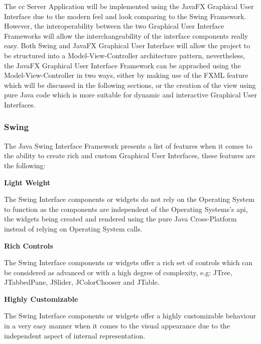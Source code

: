 The \acrfull{cc} Server Application will be implemented using the JavaFX
Graphical User Interface due to the modern feel and look comparing to the
Swing Framework. However, the interoperability between the two Graphical
User Interface Frameworks will allow the interchangeability of the interface
components really easy. Both Swing and JavaFX Graphical User Interface will
allow the project to be structured into a Model-View-Controller architecture
pattern, nevertheless, the JavaFX Graphical User Interface Framework can be
apprached using the Model-View-Controller in two ways, either by making use
of the FXML feature which will be discussed in the following sections, or
the creation of the view using pure Java code which is more suitable for dynamic
and interactive Graphical User Interfaces.

\newpage

\subsubsection{Swing}

The Java Swing Interface Framework presents a list of features when it comes
to the ability to create rich and custom Graphical User Interfaces, these
features are the following: \newline

\noindent
\textbf{Light Weight}
\newline

The Swing Interface components or widgets do not rely on the Operating System to function as the
components are independent of the Operating Systems's \acrfull{api}, the widgets being
created and rendered using the pure Java Cross-Platform instead of relying on Operating
System calls. \newline

\noindent
\textbf{Rich Controls}
\newline

The Swing Interface components or widgets offer a rich set of controls which can be considered
as advanced or with a high degree of complexity, e.g: JTree, JTabbedPane, JSlider,
JColorChooser and JTable. \newline

\noindent
\textbf{Highly Customizable}
\newline

The Swing Interface components or widgets offer a highly customizable behaviour in a very
easy manner when it comes to the visual appearance due to the independent aspect of
internal representation. \newline

